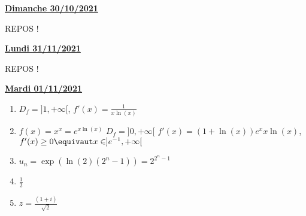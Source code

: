 \documentclass[a4paper, 11pt,reqno]{article}
\newcommand{\jour}[1]{
\begin{center}
\underline{\textbf{#1}}
\end{center}

 }
\begin{document}
\jour{Dimanche 30/10/2021}
REPOS ! 
\jour{Lundi 31/11/2021}
REPOS ! 
\newpage
\jour{Mardi 01/11/2021}
\begin{correction}
\begin{enumerate}
\item $D_f= ]1,+\infty[$, $f'(x) = \frac{1}{x\ln(x)}$
\item $f(x) =x^x=e^{x\ln(x)}$ $D_f=]0,+\infty[$ 
$f'(x) = (1+\ln(x))e^x{x\ln(x)}$, $f'(x) \geq 0 \equivaut x\in ]e^{-1}, +\infty[$

\item $u_n =\exp(\ln(2) (2^n-1)) = 2^{2^n-1}$
\item $\frac{1}{2}$
\item $z= \frac{(1+i)}{\sqrt{2}}$
\end{enumerate}
\end{correction} 

\newpage
\end{document}

